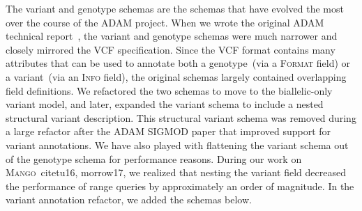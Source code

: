 \documentclass[phd]{ucbthesis}
\begin{document}
The variant and genotype schemas are the schemas that have evolved the most
over the course of the \textsc{ADAM} project. When we wrote the original
\textsc{ADAM} technical report~\cite{massie13}, the variant and genotype schemas
were much narrower and closely mirrored the \textsc{VCF} specification.
Since the VCF format contains many attributes that can be used to annotate both
a genotype~(via a \textsc{Format} field) or a variant~(via an \textsc{Info}
field), the original schemas largely contained overlapping field definitions.
We refactored the two schemas to move to the biallelic-only variant model, and
later, expanded the variant schema to include a nested structural variant
description. This structural variant schema was removed during a large refactor
after the ADAM SIGMOD paper that improved support for variant annotations. We
have also played with flattening the variant schema out of the genotype schema
for performance reasons. During our work on \textsc{Mango}~cite{tu16, morrow17},
we realized that nesting the variant field decreased the performance of range
queries by approximately an order of magnitude. In the variant annotation
refactor, we added the schemas below.
\end{document}

